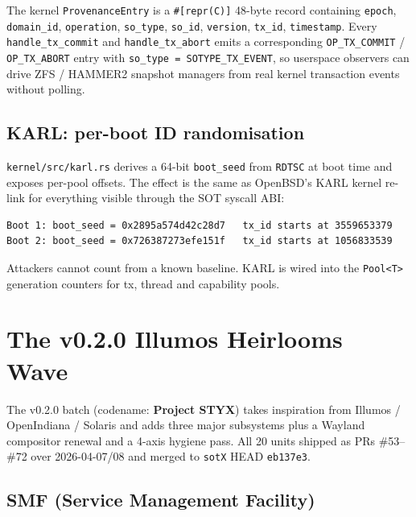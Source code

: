 \documentclass[11pt,a4paper]{article}
\begin{document}
The kernel \texttt{ProvenanceEntry} is a \texttt{\#[repr(C)]} 48-byte
record containing \texttt{epoch}, \texttt{domain\_id},
\texttt{operation}, \texttt{so\_type}, \texttt{so\_id}, \texttt{version},
\texttt{tx\_id}, \texttt{timestamp}. Every \texttt{handle\_tx\_commit}
and \texttt{handle\_tx\_abort} emits a corresponding
\texttt{OP\_TX\_COMMIT} / \texttt{OP\_TX\_ABORT} entry with
\texttt{so\_type = SOTYPE\_TX\_EVENT}, so userspace observers can drive
ZFS / HAMMER2 snapshot managers from real kernel transaction events
without polling.

\subsection{KARL: per-boot ID randomisation}

\texttt{kernel/src/karl.rs} derives a 64-bit \texttt{boot\_seed} from
\texttt{RDTSC} at boot time and exposes per-pool offsets. The effect is
the same as OpenBSD's KARL kernel re-link for everything visible
through the SOT syscall ABI:

\begin{lstlisting}[caption={Per-boot KARL drift, observed across two cold boots.},captionpos=b]
Boot 1: boot_seed = 0x2895a574d42c28d7   tx_id starts at 3559653379
Boot 2: boot_seed = 0x726387273efe151f   tx_id starts at 1056833539
\end{lstlisting}

Attackers cannot count from a known baseline. KARL is wired into the
\texttt{Pool<T>} generation counters for tx, thread and capability
pools.

\section{The v0.2.0 Illumos Heirlooms Wave}

The v0.2.0 batch (codename: \textbf{Project STYX}) takes inspiration
from Illumos / OpenIndiana / Solaris and adds three major subsystems
plus a Wayland compositor renewal and a 4-axis hygiene pass. All 20
units shipped as PRs \#53--\#72 over 2026-04-07/08 and merged to
\texttt{sotX} HEAD \texttt{eb137e3}.

\subsection{SMF (Service Management Facility)}
\end{document}
